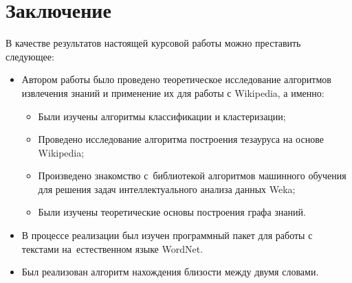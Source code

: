 \section*{Заключение}

В качестве результатов настоящей курсовой работы можно преставить следующее:

\begin{itemize}
\item{Автором работы было проведено теоретическое исследование алгоритмов извлечения знаний и применение их для работы с Wikipedia,
 а именно: 
 \begin{itemize}
\item{Были изучены алгоритмы классификации и кластеризации;}
\item{Проведено исследование алгоритма построения тезауруса на основе Wikipedia;}
\item{Произведено знакомство с~библиотекой алгоритмов машинного обучения для решения задач интеллектуального анализа данных Weka;}
\item{Были изучены теоретические основы построения графа знаний.}
 \end{itemize}}
\item{В процессе реализации был изучен программный пакет для работы с текстами на~естественном языке WordNet.}
\item{Был реализован алгоритм нахождения близости между двумя словами.}
\end{itemize}

